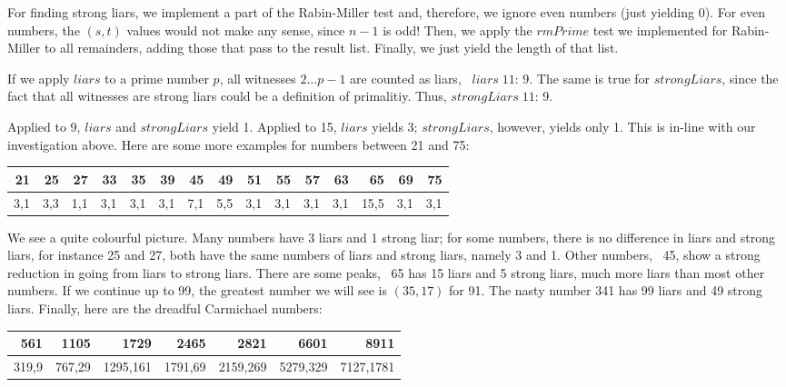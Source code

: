 \documentclass{scrreprt}
\newcommand{\Varid}[1]{\mathit{#1}}
\begin{document}
For finding strong liars, we implement a part of the
Rabin-Miller test and, therefore, 
we ignore even numbers (just yielding 0). 
For even numbers, the \ensuremath{(\Varid{s},\Varid{t})} values would not make any sense,
since $n-1$ is odd!
Then, we apply the \ensuremath{\Varid{rmPrime}} test we implemented 
for Rabin-Miller to all remainders,
adding those that pass to the result list.
Finally, we just yield the length of that list.

If we apply \ensuremath{\Varid{liars}} to a prime number $p$,
all witnesses $2\dots p-1$ are counted as liars,
\eg\ \ensuremath{\Varid{liars}\;\mathrm{11}}: 9.
The same is true for \ensuremath{\Varid{strongLiars}},
since the fact that all witnesses are strong liars
could be a definition of primalitiy.
Thus, \ensuremath{\Varid{strongLiars}\;\mathrm{11}}: 9.

Applied to 9, \ensuremath{\Varid{liars}} and \ensuremath{\Varid{strongLiars}} yield 1.
Applied to 15, \ensuremath{\Varid{liars}} yields 3;
\ensuremath{\Varid{strongLiars}}, however, yields only 1.
This is in-line with our investigation above.
Here are some more examples for numbers
between 21 and 75:

\begin{tabular}{r|r|r|r|r|r|r|r|r|r|r|r|r|r|r}
 21 &  25 &  27 &  33 &  35 &  39 &  45 &  49 &  51 &  55 &  57 &  63 &   65 &  69 &  75 \\\hline
3,1 & 3,3 & 1,1 & 3,1 & 3,1 & 3,1 & 7,1 & 5,5 & 3,1 & 3,1 & 3,1 & 3,1 & 15,5 & 3,1 & 3,1 
\end{tabular}

We see a quite colourful picture.
Many numbers have 3 liars and 1 strong liar;
for some numbers, there is no difference in liars and strong liars,
for instance 25 and 27, both have the same numbers of liars and
strong liars, namely 3 and 1.
Other numbers, \eg\ 45, show a strong reduction
in going from liars to strong liars.
There are some peaks,
\eg\ 65 has 15 liars and 5 strong liars,
much more liars than most other numbers.
If we continue up to 99, the greatest number we will see
is \ensuremath{(\mathrm{35},\mathrm{17})} for 91.
The nasty number 341 has 99 liars and 49 strong liars.
Finally, here are the dreadful Carmichael numbers:

\begin{tabular}{r|r|r|r|r|r|r}
561   &   1105 &     1729 &    2465 &     2821 &     6601 &      8911\\\hline
319,9 & 767,29 & 1295,161 & 1791,69 & 2159,269 & 5279,329 & 7127,1781
\end{tabular}
\end{document}
